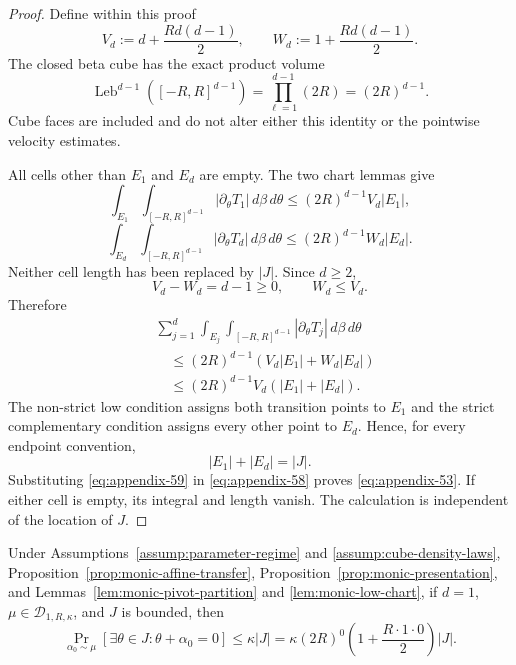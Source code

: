 \begin{proof}
Define within this proof
\[
V_d:=d+\frac{Rd(d-1)}2,
\qquad
W_d:=1+\frac{Rd(d-1)}2.
\]
The closed beta cube has the exact product volume
\begin{equation}
\operatorname{Leb}^{d-1}([-R,R]^{d-1})
=\prod_{\ell=1}^{d-1}(2R)=(2R)^{d-1}.
\label{eq:appendix-54}
\end{equation}
Cube faces are included and do not alter either this identity or the
pointwise velocity estimates.

All cells other than $E_1$ and $E_d$ are empty.  The two chart lemmas give
\begin{equation}
\int_{E_1}\int_{[-R,R]^{d-1}}
|\partial_\theta T_1|\,d\beta\,d\theta
\leq(2R)^{d-1}V_d|E_1|,
\label{eq:appendix-55}
\end{equation}
\begin{equation}
\int_{E_d}\int_{[-R,R]^{d-1}}
|\partial_\theta T_d|\,d\beta\,d\theta
\leq(2R)^{d-1}W_d|E_d|.
\label{eq:appendix-56}
\end{equation}
Neither cell length has been replaced by $|J|$.  Since $d\geq2$,
\begin{equation}
V_d-W_d=d-1\geq0,
\qquad W_d\leq V_d.
\label{eq:appendix-57}
\end{equation}
Therefore
\begin{equation}
\begin{aligned}
&\sum_{j=1}^d\int_{E_j}\int_{[-R,R]^{d-1}}
|\partial_\theta T_j|\,d\beta\,d\theta\\
&\quad\leq(2R)^{d-1}
 (V_d|E_1|+W_d|E_d|)\\
&\quad\leq(2R)^{d-1}V_d(|E_1|+|E_d|).
\end{aligned}
\label{eq:appendix-58}
\end{equation}
The non-strict low condition assigns both transition points to $E_1$ and the
strict complementary condition assigns every other point to $E_d$.  Hence,
for every endpoint convention,
\begin{equation}
|E_1|+|E_d|=|J|.
\label{eq:appendix-59}
\end{equation}
Substituting \eqref{eq:appendix-59} in \eqref{eq:appendix-58} proves \eqref{eq:appendix-53}.  If either cell is empty, its
integral and length vanish.  The calculation is independent of the location
of $J$.
\end{proof}

\begin{proposition}
\label{prop:monic-linear-branch}
Under Assumptions~\ref{assump:parameter-regime} and
\ref{assump:cube-density-laws}, Proposition~\ref{prop:monic-affine-transfer},
Proposition~\ref{prop:monic-presentation}, and
Lemmas~\ref{lem:monic-pivot-partition} and
\ref{lem:monic-low-chart}, if $d=1$,
$\mu\in\mathcal D_{1,R,\kappa}$, and $J$ is bounded, then
\begin{equation}
\Pr_{\alpha_0\sim\mu}
[\exists\theta\in J:\theta+\alpha_0=0]
\leq\kappa|J|
=\kappa(2R)^0
 \left(1+\frac{R\cdot1\cdot0}{2}\right)|J|.
\label{eq:appendix-60}
\end{equation}
\end{proposition}

